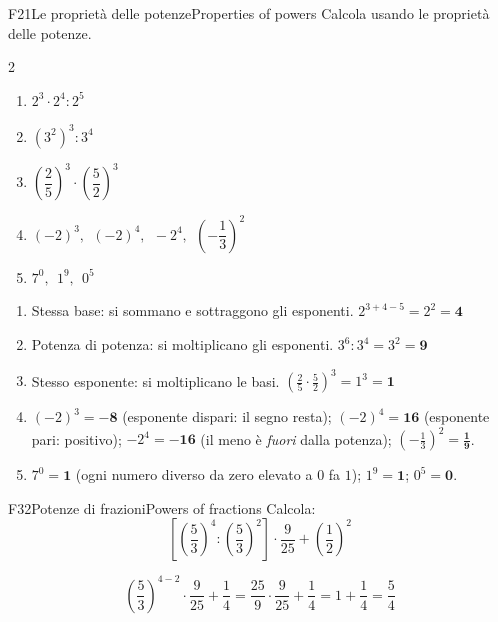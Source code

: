 \begin{esercizio}{F2}{1}{Le proprietà delle potenze}{Properties of powers}
Calcola usando le proprietà delle potenze. 
\begin{multicols}{2}
\begin{enumerate}
\item $2^3\cdot 2^4:2^5$
\item $(3^2)^3:3^4$
\item $\left(\dfrac25\right)^3\cdot\left(\dfrac52\right)^3$
\item $(-2)^3,\ \ (-2)^4,\ \ -2^4,\ \ \left(-\dfrac13\right)^2$
\item $7^0,\ \ 1^9,\ \ 0^5$
\end{enumerate}
\end{multicols}
\end{esercizio}
\begin{solbox}
\begin{enumerate}
\item Stessa base: si sommano e sottraggono gli esponenti. $2^{3+4-5}=2^2=\mathbf{4}$
\item Potenza di potenza: si moltiplicano gli esponenti. $3^{6}:3^4=3^{2}=\mathbf{9}$
\item Stesso esponente: si moltiplicano le basi. $\left(\frac25\cdot\frac52\right)^3=1^3=\mathbf{1}$
\item $(-2)^3=\mathbf{-8}$ (esponente dispari: il segno resta); $(-2)^4=\mathbf{16}$ (esponente pari: positivo); $-2^4=\mathbf{-16}$ (il meno è \emph{fuori} dalla potenza); $\left(-\frac13\right)^2=\mathbf{\frac19}$.
\item $7^0=\mathbf{1}$ (ogni numero diverso da zero elevato a $0$ fa $1$); $1^9=\mathbf{1}$; $0^5=\mathbf{0}$.
\end{enumerate}
\end{solbox}

\begin{esercizio}{F3}{2}{Potenze di frazioni}{Powers of fractions}
Calcola: 
\[\left[\left(\frac53\right)^4:\left(\frac53\right)^2\right]\cdot\frac{9}{25}+\left(\frac12\right)^2\]
\end{esercizio}
\begin{solbox}
\[
\left(\frac53\right)^{4-2}\cdot\frac{9}{25}+\frac14
=\frac{25}{9}\cdot\frac{9}{25}+\frac14
=1+\frac14=\boxed{\frac54}
\]
\end{solbox}

